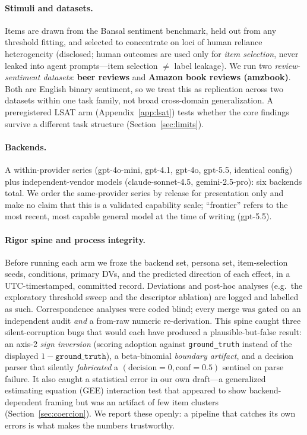 \documentclass[manuscript,review,anonymous]{acmart}
\begin{document}
\paragraph{Stimuli and datasets.} Items are drawn from the Bansal sentiment benchmark, held out from any
threshold fitting, and selected to concentrate on loci of human reliance heterogeneity (disclosed; human
outcomes are used only for \emph{item selection}, never leaked into agent prompts---item selection $\ne$
label leakage). We run two \emph{review-sentiment datasets}: \textbf{beer reviews} and \textbf{Amazon book
reviews (amzbook)}. Both are English binary sentiment, so we treat this as replication across two
datasets within one task family, not broad cross-domain generalization. A preregistered LSAT arm
(Appendix~\ref{app:lsat}) tests whether the core findings survive a different task structure
(Section~\ref{sec:limits}).

\paragraph{Backends.} A within-provider series (gpt-4o-mini, gpt-4.1, gpt-4o, gpt-5.5, identical config)
plus independent-vendor models (claude-sonnet-4.5, gemini-2.5-pro): six backends total. We order the
same-provider series by release for presentation only and make no claim that this is a validated capability
scale; ``frontier'' refers to the most recent, most capable general model at the time of writing (gpt-5.5).

\paragraph{Rigor spine and process integrity.} Before running each arm we froze the backend set, persona
set, item-selection seeds, conditions, primary DVs, and the predicted direction of each effect, in a
UTC-timestamped, committed record. Deviations and post-hoc analyses (e.g.\ the exploratory threshold sweep
and the descriptor ablation) are logged and labelled as such. Correspondence analyses were coded blind;
every merge was gated on an independent audit \emph{and} a from-raw numeric re-derivation. This spine caught
three silent-corruption bugs that would each have produced a plausible-but-false result: an axis-2
\emph{sign inversion} (scoring adoption against \texttt{ground\_truth} instead of the displayed
$1-\texttt{ground\_truth}$), a beta-binomial \emph{boundary artifact}, and a decision parser that silently
\emph{fabricated} a $(\text{decision}{=}0,\text{conf}{=}0.5)$ sentinel on parse failure. It also caught a
statistical error in our own draft---a generalized estimating equation (GEE) interaction test that appeared to show backend-dependent framing
but was an artifact of few item clusters (Section~\ref{sec:coercion}). We report these openly: a pipeline
that catches its own errors is what makes the numbers trustworthy.
\end{document}
